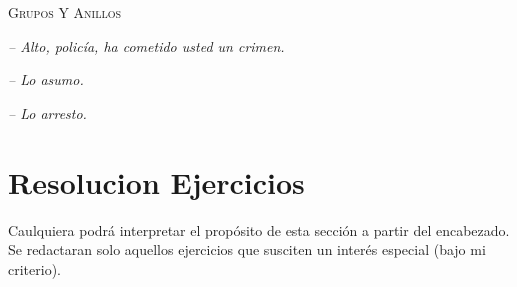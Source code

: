 \documentclass{article}
\begin{document}
\begin{titlepage}
    \begin{center}
        {\Huge \textsc{Grupos Y Anillos}}
    \end{center}

    \vspace{10px}

    \hfill{\textit{-- Alto, policía, ha cometido usted un crimen.}}

    \hfill{\textit{-- Lo asumo.}}

    \hfill{\textit{-- Lo arresto.}}

    \tableofcontents
\end{titlepage}

\newpage

\section{Resolucion Ejercicios}

Caulquiera podrá interpretar el propósito de esta sección a partir del encabezado. Se redactaran solo aquellos ejercicios que susciten un interés especial (bajo mi criterio).
\end{document}
